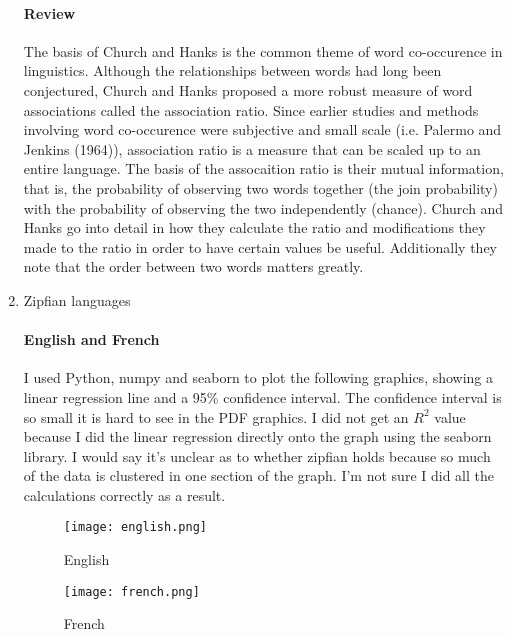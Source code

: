 \documentclass[12pt]{article}
\begin{document}
\begin{enumerate}
\paragraph{Review} The basis of Church and Hanks is the common theme of word co-occurence
        in linguistics. Although the relationships between words had long been conjectured,
        Church and Hanks proposed a more robust measure of word associations called the 
        association ratio. Since earlier studies and methods involving word co-occurence 
        were subjective and small scale (i.e. Palermo and Jenkins (1964)), association
        ratio is a measure that can be scaled up to an entire language. The basis of the
        assocaition ratio is their mutual information, that is, the probability of observing
        two words together (the join probability) with the probability of observing the two
        independently (chance). Church and Hanks go into detail in how they calculate the
        ratio and modifications they made to the ratio in order to have certain values be
        useful. Additionally they note that the order between two words matters greatly.

\item Zipfian languages
\paragraph{English and French} I used Python, numpy and seaborn to plot the following graphics,
        showing a linear regression line and a 95\% confidence interval. The confidence interval
        is so small it is hard to see in the PDF graphics. I did not get an $R^2$ value because
        I did the linear regression directly onto the graph using the seaborn library. 
        I would say it's unclear as to whether zipfian holds because so much of the data is
        clustered in one section of the graph. I'm not sure I did all the calculations correctly
        as a result.
        \begin{figure}[h]
            \caption{English}
            \centering
            \texttt{[image: english.png]}
        \end{figure}
        \begin{figure}[h]
            \caption{French}
            \centering
            \texttt{[image: french.png]}
        \end{figure}
\end{enumerate}
\end{document}
